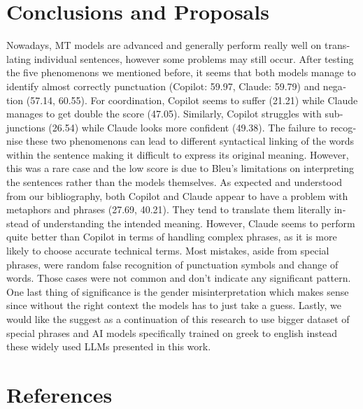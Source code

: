 \documentclass[twocolumn]{article}
\newcommand{\en}[1]{\foreignlanguage{english}{#1}}
\begin{document}
\section{\en{Conclusions and Proposals}}
\en{Nowadays, MT models are advanced and generally perform really well on translating individual sentences, however some problems may still occur. After testing the five phenomenons we mentioned before, it seems that both models manage to identify almost correctly punctuation (Copilot: 59.97, Claude: 59.79) and negation (57.14, 60.55). For coordination, Copilot seems to suffer (21.21) while Claude manages to get double the score (47.05). Similarly, Copilot struggles with subjunctions (26.54) while Claude looks more confident (49.38). The failure to recognise these two phenomenons can lead to different syntactical linking of the words within the sentence making it difficult to express its original meaning. However, this was a rare case and the low score is due to Bleu’s limitations on interpreting the sentences rather than the models themselves. As expected and understood from our bibliography, both Copilot and Claude appear to have a problem with metaphors and phrases (27.69, 40.21). They tend to translate them literally instead of understanding the intended meaning. However, Claude seems to perform quite better than Copilot in terms of handling complex phrases, as it is more likely to choose accurate technical terms. Most mistakes, aside from special phrases, were random false recognition of punctuation symbols and change of words. Those cases were not common and don’t indicate any significant pattern. One last thing of significance is the gender misinterpretation which makes sense since without the right context the models has to just take a guess. 
Lastly, we would like the suggest as a continuation of this research to use bigger dataset of special phrases and AI models specifically trained on greek to english instead these widely used LLMs presented in this work. }
\section{\en{References}}
\en{\printbibliography}
\end{document}
